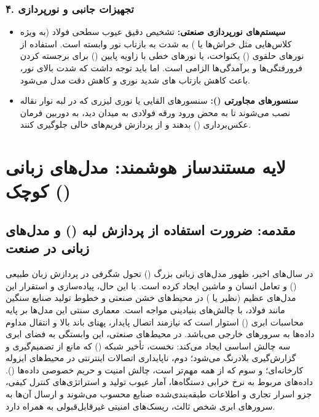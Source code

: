 \documentclass[a4paper, 10pt, twocolumn]{article}
\begin{document}
	\subsubsection*{۴. تجهیزات جانبی و نورپردازی}
	\begin{itemize}
		\item \textbf{سیستم‌های نورپردازی صنعتی:} تشخیص دقیق عیوب سطحی فولاد (به ویژه کلاس‌هایی مثل خراش‌ها یا ) به شدت به بازتاب نور وابسته است. استفاده از نورهای حلقوی () یکنواخت، یا نورهای خطی با زاویه پایین () برای برجسته کردن فرورفتگی‌ها و برآمدگی‌ها الزامی است. اما باید توجه داشت که شدت بالای نور، باعث کاهش بازتاب های شدید نوری و کاهش دقت مدل می‌شود.
		\item \textbf{سنسورهای مجاورتی ():} سنسورهای القایی یا نوری لیزری که در لبه نوار نقاله نصب می‌شوند تا به محض ورود ورقه فولادی به میدان دید، به دوربین فرمان عکس‌برداری () بدهند و از پردازش فریم‌های خالی جلوگیری کنند.
	\end{itemize}
	
	
	\section{لایه مستندساز هوشمند: مدل‌های زبانی کوچک ()}
	
	\subsection{مقدمه: ضرورت استفاده از پردازش لبه () و مدل‌های زبانی در صنعت}
	
	در سال‌های اخیر، ظهور مدل‌های زبانی بزرگ () تحول شگرفی در پردازش زبان طبیعی () و تعامل انسان و ماشین ایجاد کرده است. با این حال، پیاده‌سازی و استقرار این مدل‌های عظیم (نظیر  یا ) در محیط‌های خشن صنعتی و خطوط تولید صنایع سنگین مانند فولاد، با چالش‌های بنیادینی مواجه است. معماری سنتی این مدل‌ها بر پایه محاسبات ابری () استوار است که نیازمند اتصال پایدار، پهنای باند بالا و انتقال مداوم داده‌ها به سرورهای خارجی می‌باشد. در محیط‌های صنعتی، این وابستگی به فضای ابری سه چالش اساسی ایجاد می‌کند: نخست، تأخیر شبکه () که مانع از تصمیم‌گیری و گزارش‌گیری بلادرنگ می‌شود؛ دوم، ناپایداری اتصالات اینترنتی در محیط‌های ایزوله کارخانه‌ای؛ و سوم که از همه مهم‌تر است، چالش امنیت و حریم خصوصی داده‌ها (). داده‌های مربوط به نرخ خرابی دستگاه‌ها، آمار عیوب تولید و استراتژی‌های کنترل کیفی، جزو اسرار تجاری و اطلاعات طبقه‌بندی‌شده صنایع محسوب می‌شوند و ارسال آن‌ها به سرورهای ابری شخص ثالث، ریسک‌های امنیتی غیرقابل‌قبولی به همراه دارد.
	
\end{document}
